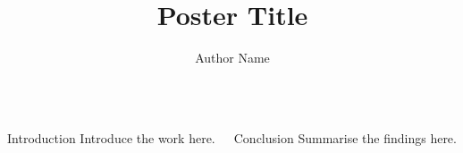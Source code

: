 \documentclass{beamer}
\title{Poster Title}
\author{Author Name}
\begin{document}
\begin{frame}
\begin{columns}[t]
  \begin{block}{Introduction}
    Introduce the work here.
  \end{block}
  \begin{block}{Conclusion}
    Summarise the findings here.
  \end{block}
\end{columns}
\end{frame}
\end{document}
